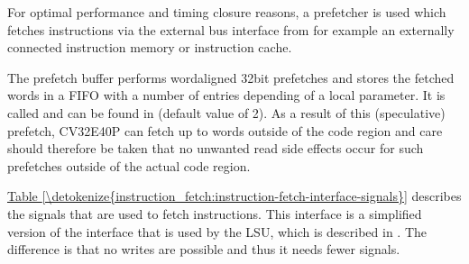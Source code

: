 \documentclass[letterpaper,10pt,english]{sphinxmanual}
\begin{document}
\sphinxAtStartPar
For optimal performance and timing closure reasons, a prefetcher is used
which fetches instructions via the external bus interface from for example
an externally connected instruction memory or instruction cache.

\sphinxAtStartPar
The prefetch buffer performs word\sphinxhyphen{}aligned 32\sphinxhyphen{}bit prefetches and stores the
fetched words in a FIFO with a number of entries depending of a local parameter.
It is called  and can be found in  (default value of 2).
As a result of this (speculative) prefetch, CV32E40P can fetch up to  words outside of the code region
and care should therefore be taken that no unwanted read side effects occur
for such prefetches outside of the actual code region.

\sphinxAtStartPar
\hyperref[\detokenize{instruction_fetch:instruction-fetch-interface-signals}]{Table \ref{\detokenize{instruction_fetch:instruction-fetch-interface-signals}}} describes the signals that are used to fetch instructions. This
interface is a simplified version of the interface that is used by the
LSU, which is described in {\hyperref[\detokenize{load_store_unit:load-store-unit}]{}}. The difference is that no writes
are possible and thus it needs fewer signals.
\end{document}
